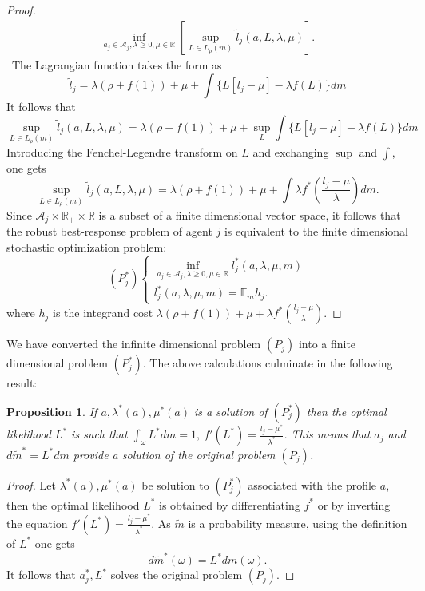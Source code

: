 \documentclass{article}
\newtheorem{proposition}{Proposition}
\begin{document}
\begin{proof}
\begin{equation}
\begin{array}{l}
\inf_{a_j\in \mathcal{A}_j,\lambda\geq 0,\mu\in \mathbb{R}}[\sup_{L\in L_{\rho}(m)} \tilde{l}_j(a,L,\lambda,\mu)].
\end{array}
\end{equation}\
The Lagrangian function takes the form as
\begin{equation}
\tilde{l}_j=  \lambda(\rho+f(1))+\mu +\int \{ L [ {l}_j-\mu] -\lambda f(L)\} dm
\end{equation}
It follows that
\begin{equation}
\sup_{L\in L_{\rho}(m)} \tilde{l}_j(a,L,\lambda,\mu) = \lambda(\rho+f(1))+\mu +\sup_{L}\int \{ L [{l}_j-\mu] - \lambda f(L)\} dm
\end{equation}
Introducing the Fenchel-Legendre transform on $L$ and exchanging $\sup$ and $\int$, one gets
\begin{equation}
\sup_{L\in L_{\rho}(m)} \tilde{l}_j(a,L,\lambda,\mu) = \lambda(\rho+f(1))+\mu +\int \lambda f^*(\frac{ {l}_j-\mu}{\lambda}) dm.
\end{equation}
Since $\mathcal{A}_j\times\mathbb{R}_+\times \mathbb{R}$ is a subset of a finite dimensional vector space, it follows that the robust best-response problem of agent $j$ is equivalent to the finite dimensional stochastic optimization problem:
\begin{equation}\label{eq:finite2} ({P}^*_j)\left\{
\begin{array}{l}
\inf_{a_j\in \mathcal{A}_j,\lambda\geq 0,\mu\in \mathbb{R}}l_j^*(a,\lambda,\mu,m)
\\ l_j^*(a,\lambda,\mu,m) = \mathbb{E}_{m} h_j.
\end{array} \right.
\end{equation}
where $h_j$ is the integrand cost $\lambda(\rho+f(1))+\mu + \lambda f^*(\frac{ {l}_j-\mu}{\lambda})$.
\end{proof}

We have converted the infinite dimensional problem $(P_j)$ into a finite dimensional problem $(P_j^*)$. The above calculations culminate in the following result:
\begin{proposition}
If $a, \lambda^*(a), \mu^*(a)$ is a solution of $(P_j^*)$ then the optimal likelihood $L^*$ is such that $\int_{\omega} L^* dm=1,\ f'(L^*)=\frac{ l_j-\mu^*}{\lambda^*}$. This means that $a_j$ and $d\tilde{m}^*=L^*dm$ provide a solution of the original problem $(P_j)$.
\end{proposition}

\begin{proof}
Let $\lambda^*(a), \mu^*(a)$ be solution to $(P_j^*)$ associated with the profile $a$, then the optimal likelihood $L^*$ is obtained by differentiating $f^*$ or by inverting the equation $f'(L^*)=\frac{ l_j-\mu^*}{\lambda^*}$. As $\tilde{m}$ is a probability measure, using the definition of $L^*$ one gets
$$d\tilde{m}^*(\omega)=  L^*dm(\omega).
$$
It follows that $a^*_j, L^*$ solves the original problem $(P_j)$.
\end{proof}
\end{document}
